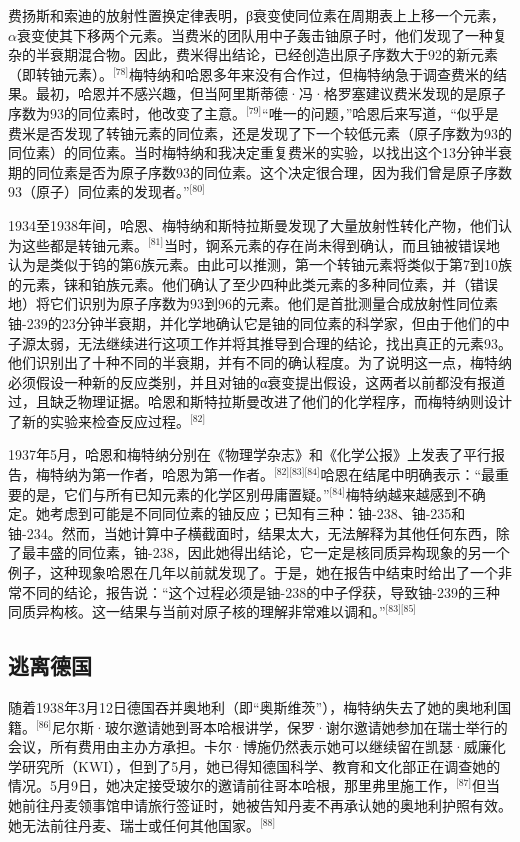 费扬斯和索迪的放射性置换定律表明，β衰变使同位素在周期表上上移一个元素，$\alpha$衰变使其下移两个元素。当费米的团队用中子轰击铀原子时，他们发现了一种复杂的半衰期混合物。因此，费米得出结论，已经创造出原子序数大于92的新元素（即转铀元素）。\(^\text{[78]}\)梅特纳和哈恩多年来没有合作过，但梅特纳急于调查费米的结果。最初，哈恩并不感兴趣，但当阿里斯蒂德·冯·格罗塞建议费米发现的是原子序数为93的同位素时，他改变了主意。\(^\text{[79]}\)“唯一的问题，”哈恩后来写道，“似乎是费米是否发现了转铀元素的同位素，还是发现了下一个较低元素（原子序数为93的同位素）的同位素。当时梅特纳和我决定重复费米的实验，以找出这个13分钟半衰期的同位素是否为原子序数93的同位素。这个决定很合理，因为我们曾是原子序数93（原子）同位素的发现者。”\(^\text{[80]}\)

1934至1938年间，哈恩、梅特纳和斯特拉斯曼发现了大量放射性转化产物，他们认为这些都是转铀元素。\(^\text{[81]}\)当时，锕系元素的存在尚未得到确认，而且铀被错误地认为是类似于钨的第6族元素。由此可以推测，第一个转铀元素将类似于第7到10族的元素，铼和铂族元素。他们确认了至少四种此类元素的多种同位素，并（错误地）将它们识别为原子序数为93到96的元素。他们是首批测量合成放射性同位素铀-239的23分钟半衰期，并化学地确认它是铀的同位素的科学家，但由于他们的中子源太弱，无法继续进行这项工作并将其推导到合理的结论，找出真正的元素93。他们识别出了十种不同的半衰期，并有不同的确认程度。为了说明这一点，梅特纳必须假设一种新的反应类别，并且对铀的α衰变提出假设，这两者以前都没有报道过，且缺乏物理证据。哈恩和斯特拉斯曼改进了他们的化学程序，而梅特纳则设计了新的实验来检查反应过程。\(^\text{[82]}\)

1937年5月，哈恩和梅特纳分别在《物理学杂志》和《化学公报》上发表了平行报告，梅特纳为第一作者，哈恩为第一作者。\(^\text{[82][83][84]}\)哈恩在结尾中明确表示：“最重要的是，它们与所有已知元素的化学区别毋庸置疑。”\(^\text{[84]}\)梅特纳越来越感到不确定。她考虑到可能是不同同位素的铀反应；已知有三种：铀-238、铀-235和铀-234。然而，当她计算中子横截面时，结果太大，无法解释为其他任何东西，除了最丰盛的同位素，铀-238，因此她得出结论，它一定是核同质异构现象的另一个例子，这种现象哈恩在几年以前就发现了。于是，她在报告中结束时给出了一个非常不同的结论，报告说：“这个过程必须是铀-238的中子俘获，导致铀-239的三种同质异构核。这一结果与当前对原子核的理解非常难以调和。”\(^\text{[83][85]}\)
\subsection{逃离德国}
随着1938年3月12日德国吞并奥地利（即“奥斯维茨”），梅特纳失去了她的奥地利国籍。\(^\text{[86]}\)尼尔斯·玻尔邀请她到哥本哈根讲学，保罗·谢尔邀请她参加在瑞士举行的会议，所有费用由主办方承担。卡尔·博施仍然表示她可以继续留在凯瑟·威廉化学研究所（KWI），但到了5月，她已得知德国科学、教育和文化部正在调查她的情况。5月9日，她决定接受玻尔的邀请前往哥本哈根，那里弗里施工作，\(^\text{[87]}\)但当她前往丹麦领事馆申请旅行签证时，她被告知丹麦不再承认她的奥地利护照有效。她无法前往丹麦、瑞士或任何其他国家。\(^\text{[88]}\)

